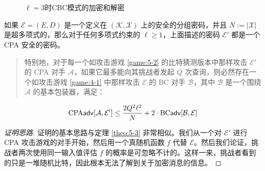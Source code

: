 %

\begin{figure}[p!]
  \centering
  \subfigure[加密]{}
  
  \,
  
  \,
  
  \subfigure[解密]{}
  \caption{$\ell=3$时CBC模式的加密和解密}
  \label{fig:5-4}
\end{figure}

\begin{theorem}\label{theo:5-4}
如果 $\mathcal{E}=(E,D)$ 是一个定义在 $(\mathcal{K},\mathcal{X})$ 上的安全的分组密码，并且 $N:=|\mathcal{X}|$ 是超多项式的，那么对于任何多项式约束的 $\ell\geq1$，上面描述的密码 $\mathcal{E}'$ 都是一个 CPA 安全的密码。
\begin{quote}
特别地，对于每一个如攻击游戏 \ref{game:5-2} 的比特猜测版本中那样攻击 $\mathcal{E}'$ 的 CPA 对手 $\mathcal{A}$，如果它最多能向其挑战者发起 $Q$ 次查询，则必然存在一个如攻击游戏 \ref{game:4-1} 中那样攻击 $\mathcal{E}$ 的 BC 对手 $\mathcal{B}$，其中 $\mathcal{B}$ 是一个围绕 $\mathcal{A}$ 的基本包装器，满足：
\end{quote}
\begin{equation}\label{eq:5-22}
{\rm CPA}\mathsf{adv}[\mathcal{A},\mathcal{E}']\leq\frac{2Q^2\ell^2}{N}+2\cdot{\rm BC\mathsf{adv}}[\mathcal{B},\mathcal{E}]
\end{equation}
\end{theorem}

\begin{proof}[证明思路]
证明的基本思路与定理 \ref{theo:5-3} 非常相似。我们从一个对 $\mathcal{E}'$ 进行 CPA 攻击游戏的对手开始，然后用一个真随机函数 $f$ 代替 $\mathcal{E}$。然后我们论证，挑战者两次使用同一输入值评估 $f$ 的概率是可忽略不计的。这样一来，挑战者看到的只是一堆随机比特，因此根本无法了解到关于加密消息的信息。
\end{proof}

